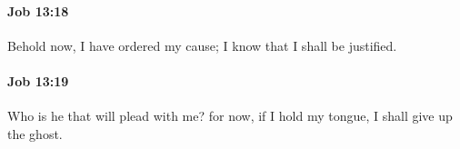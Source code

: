		\paragraph{Job 13:18} %
			\label{JOB-13-18}

			Behold now, I have ordered my cause; I know that I shall be justified.


		\paragraph{Job 13:19} %
			\label{JOB-13-19}

			Who is he that will plead with me? for now, if I hold my tongue, I shall give up the ghost.


